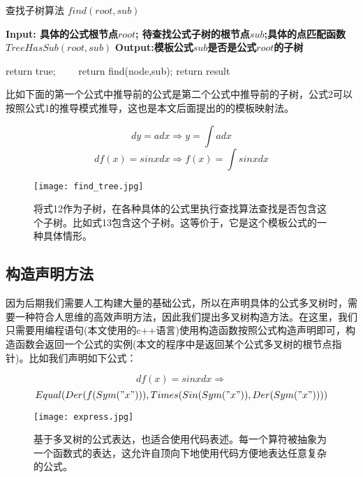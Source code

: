 \documentclass[runningheads]{llncs}
\begin{document}
\begin{algorithm}[t]
\caption{查找子树算法 $find(root,sub)$} %
\hspace*{0.02in} {\bf Input: 具体的公式根节点$root$; 待查找公式子树的根节点$sub$;具体的点匹配函数$TreeHasSub(root,sub)$} 
\hspace*{0.02in} {\bf Output:模板公式$sub$是否是公式$root$的子树} 
\begin{algorithmic}[1]
        return true;
    \EndIf
\EndIf
{} %
　　\State return find(node,sub);
\EndFor
\State return result
\end{algorithmic}
\end{algorithm}


比如下面的第一个公式中推导前的公式是第二个公式中推导前的子树，公式2可以按照公式1的推导模式推导，这也是本文后面提出的的模板映射法。

$$dy=adx \Rightarrow y=\int{adx} $$
$$df(x)=sinxdx \Rightarrow f(x)=\int{sinxdx} $$

\begin{figure}[H]
\centering
\texttt{[image: find\_tree.jpg]}
\caption{将式12作为子树，在各种具体的公式里执行查找算法查找是否包含这个子树。比如式13包含这个子树。这等价于，它是这个模板公式的一种具体情形。}
\end{figure}



\subsection{构造声明方法}
因为后期我们需要人工构建大量的基础公式，所以在声明具体的公式多叉树时，需要一种符合人思维的高效声明方法，因此我们提出多叉树构造方法。在这里，我们只需要用编程语句(本文使用的c++语言)使用构造函数按照公式构造声明即可，构造函数会返回一个公式的实例(本文的程序中是返回某个公式多叉树的根节点指针)。比如我们声明如下公式：

$$df(x)=sinxdx \Rightarrow$$
$$Equal(Der(f(Sym("x"))), Times(Sin(Sym("x")),Der(Sym("x"))))$$

\begin{figure}[H]
\centering
\texttt{[image: express.jpg]}
\caption{基于多叉树的公式表达，也适合使用代码表述。每一个算符被抽象为一个函数式的表达，这允许自顶向下地使用代码方便地表达任意复杂的公式。}
\end{figure}
\end{document}
